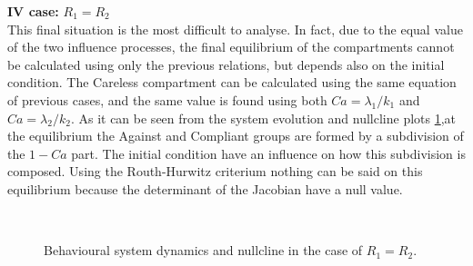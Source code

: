 \textbf{IV case:} $R_1 = R_2$ \\
This final situation is the most difficult to analyse. In fact, due to the equal value of the two influence processes, the final equilibrium of the compartments cannot be calculated using only the previous relations, but depends also on the initial condition. 
The Careless compartment can be calculated using the same equation of previous cases, and the same value is found using both $Ca = \lambda_1/k_1$ and $Ca = \lambda_2/k_2$. As it can be seen from the system evolution and nullcline plots \ref{fig:r1r2equaldyn},at the equilibrium the Against and Compliant groups are formed by a subdivision of the $1 - Ca$ part. The initial condition have an influence on how this subdivision is composed. Using the Routh-Hurwitz criterium nothing can be said on this equilibrium because the determinant of the Jacobian have a null value.
\begin{figure}[h]
	\centering
	 \quad
	 \\
	\caption[Behavioural model fourth case]{Behavioural system dynamics and nullcline in the case of   $R_1 = R_2$.}
	\label{fig:r1r2equaldyn}
\end{figure}

